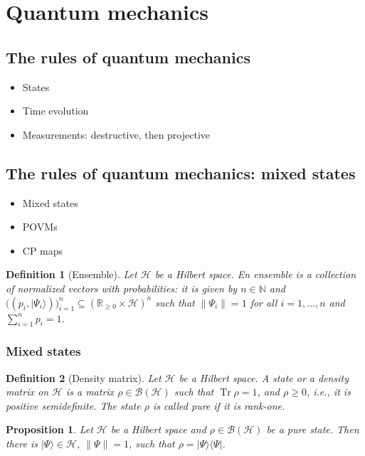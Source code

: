 \documentclass{article}
\newtheorem{proposition}{Proposition}
\newtheorem{definition}{Definition}
\theoremstyle{definition}
\newcommand{\tr}{\operatorname{Tr}}
\newcommand{\ket}[1]{\vert #1 \rangle}
\newcommand{\bra}[1]{\langle #1 \vert}
\newcommand{\bounded}[1]{\mathcal{B}(#1)}
\begin{document}
\section{Quantum mechanics}

\subsection{The rules of quantum mechanics}
 \begin{itemize}
   \item States
   \item Time evolution
   \item Measurements: destructive, then projective
 \end{itemize}
 
\subsection{The rules of quantum mechanics: mixed states}
\begin{itemize}
  \item Mixed states
  \item POVMs
  \item CP maps
\end{itemize}


\begin{definition}[Ensemble]
  Let $\mathcal{H}$ be a Hilbert space. En \emph{ensemble} is a collection of normalized vectors with probabilities: it is given by $n\in\mathbb{N}$ and $\big((p_i, \ket{\Psi_i})\big)_{i=1}^n \subseteq (\mathbb{R}_{\geq 0} \times \mathcal{H})^n$ such that $\|\Psi_i\| = 1$ for all $i=1,\dots,n$ and $\sum_{i=1}^n p_i = 1$.
\end{definition}
\subsubsection{Mixed states}

\begin{definition}[Density matrix]
  Let $\mathcal{H}$ be a Hilbert space. A \emph{state} or a \emph{density matrix} on $\mathcal{H}$ is a matrix $\rho\in\bounded{\mathcal{H}}$ such that $\tr\rho = 1$, and $\rho\geq 0$, i.e., it is positive semidefinite. The state $\rho$ is called \emph{pure} if it is rank-one. 
\end{definition}

\begin{proposition}
  Let $\mathcal{H}$ be a Hilbert space and $\rho\in\bounded{\mathcal{H}}$ be a pure state. Then there is $\ket{\Psi}\in\mathcal{H}$, $\|\Psi\| = 1$, such that $\rho  = \ket{\Psi} \bra{\Psi}$.
\end{proposition}
\end{document}

